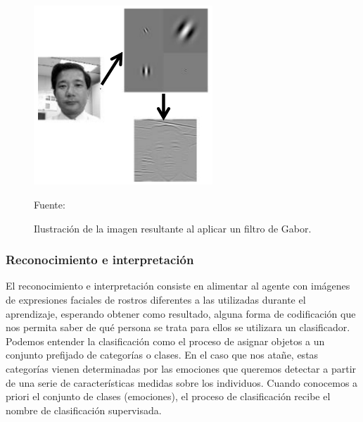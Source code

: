 \begin{enumerate}
\begin{figure}[ht]
\begin{center}
\includegraphics[width=0.6\textwidth]{Imagen24}
\end{center}
\begin{center}
\vskip -0.5cm
\caption{\small{Ilustración de la imagen resultante al aplicar un filtro de Gabor.}}
{\small{Fuente: \cite{Aguilar}}}
\end{center}
\end{figure}

\end{enumerate}

\subsubsection{Reconocimiento e interpretación}

El reconocimiento e interpretación consiste en alimentar al agente con imágenes de expresiones faciales de rostros diferentes a las utilizadas durante el aprendizaje, esperando obtener como resultado, alguna forma de codificación que nos permita saber de qué persona se trata para ellos se utilizara un clasificador.
\vskip 0.1cm
Podemos entender la clasificación como el proceso de asignar objetos a un conjunto prefijado de categorías o clases. En el caso que nos atañe, estas categorías vienen determinadas por las emociones que queremos detectar a partir de una serie de características medidas sobre los individuos. Cuando conocemos a priori el conjunto de clases (emociones), el proceso de clasificación recibe el nombre de clasificación supervisada.

